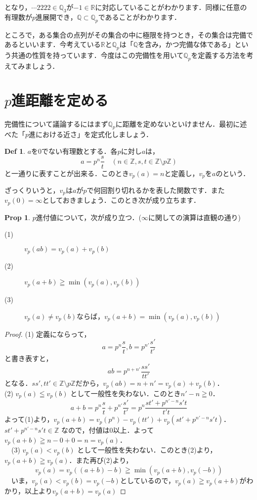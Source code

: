 \documentclass[./main]{subfiles}
\theoremstyle{definition}
\newtheorem{defi}[theo]{Def}
\newtheorem{prop}[theo]{Prop}
\newcommand{\Z}{\mathbb{Z}}%
\newcommand{\Q}{\mathbb{Q}}%
\newcommand{\Qp}{\mathbb{Q}_p}%
\newcommand{\R}{\mathbb{R}}%
\begin{document}
となり，$\cdots 2222\in \Q_3$が$-1\in\R$に対応していることがわかります．同様に任意の有理数が$p$進展開でき，$\Q \subset \Qp$であることがわかります．

ところで，ある集合の点列がその集合の中に極限を持つとき，その集合は完備であるといいます．今考えている$\R$と$\Qp$は「$\Q$を含み，かつ完備な体である」という共通の性質を持っています．今度はこの完備性を用いて$\Qp$を定義する方法を考えてみましょう．

\section{$p$進距離を定める}

完備性について議論するにはまず$\Qp$に距離を定めないといけません．最初に述べた「$p$進における近さ」を定式化しましょう．

\begin{defi}
$a$を0でない有理数とする．各$p$に対し$a$は，
\[
a=p^n \frac{s}{t} \quad (n\in \Z, s,t \in \Z \setminus p\Z )
\]
と一通りに表すことが出来る．このとき$v_p(a)=n$と定義し，$v_p$を$a$のという．
\end{defi}

ざっくりいうと，$v_p$は$a$が$p$で何回割り切れるかを表した関数です．また$v_p(0)=\infty$としておきましょう．このとき次が成り立ちます．

\begin{prop}
$p$進付値について，次が成り立つ．($\infty$に関しての演算は直観の通り)
\begin{description}
	\item[(1)] $v_p(ab)=v_p(a)+v_p(b)$
	\item[(2)] $v_p(a+b) \geqq \min(v_p(a),v_p(b))$
	\item[(3)] $v_p(a) \neq v_p(b)$ならば，$v_p(a+b)=\min(v_p(a),v_p(b))$
\end{description}
\end{prop}

\begin{proof}
	(1) 定義にならって，
	\[
	a=p^n \frac{s}{t},b=p^{n'} \frac{s'}{t'}
	\]
	と書き表すと，
	\[
	ab=p^{n+n'}\frac{ss'}{tt'}
	\]
	となる．$ss',tt' \in \Z \setminus p\Z$だから，$v_p(ab)=n+n'=v_p(a)+v_p(b)$． \\
	(2) $v_p(a) \leqq v_p(b)$ として一般性を失わない．このとき$n'-n \geqq 0$．
　\[
　a+b=p^n \frac{s}{t} + p^{n'} \frac{s'}{t'} = p^n\frac{st'+p^{n'-n}s't}{t't}
　\]
	よって(1)より，$v_p(a+b) = v_p(p^n) - v_p(tt') + v_p(st'+p^{n'-n}s't)$．$st'+p^{n'-n}s't \in \Z$ なので，付値は0以上．よって$v_p(a+b) \geqq n-0+0 =n= v_p(a)$．\\
　(3) $v_p(a) < v_p(b)$ として一般性を失わない．このとき(2)より，$v_p(a+b) \geqq v_p(a)$．また再び(2)より，
　\[
　v_p(a)=v_p((a+b)-b) \geqq \min(v_p(a+b),v_p(-b))
　\]
　いま，$v_p(a) < v_p(b)=v_p(-b)$としているので，$v_p(a) \geqq v_p(a+b)$がわかり，以上より$v_p(a+b)=v_p(a)$
\end{proof}
\end{document}
